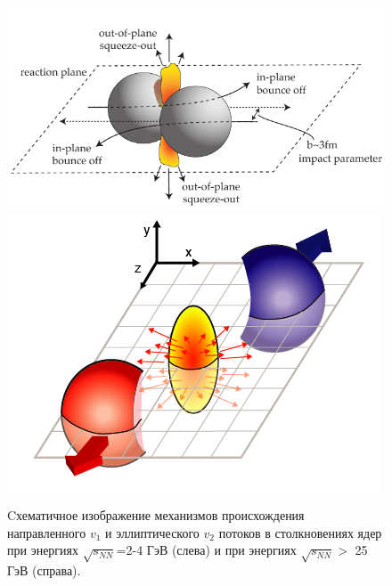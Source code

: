 \begin{figure}[h]
\begin{center}
  \includegraphics[width=0.55\linewidth]{images/flow1.png}
 \includegraphics[width=0.4\linewidth]{images/illustration_1_initial_spatial_asymmetry.png}
\caption{ Cхематичное изображение механизмов происхождения направленного $v_1$ и эллиптического $v_2$ потоков в
  столкновениях ядер при энергиях $\sqrt{s_{NN}}$=2-4 ГэВ (слева) и  при энергиях
  $\sqrt{s_{NN}}>$ 25 ГэВ (справа).}
\label{fig:bounce_off}
\end{center}
\end{figure}

